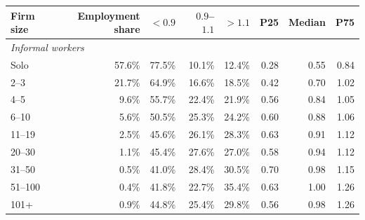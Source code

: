 \begin{tabular}{lrrrrrrr}
\toprule
    Firm size & Employment share & $<0.9$ & $0.9$--$1.1$ & $>1.1$ & P25 & Median & P75 \\
    \midrule
\multicolumn{8}{l}{\textit{Informal workers}} \\
Solo & 57.6\% & 77.5\% & 10.1\% & 12.4\% & 0.28 & 0.55 & 0.84 \\
2--3 & 21.7\% & 64.9\% & 16.6\% & 18.5\% & 0.42 & 0.70 & 1.02 \\
4--5 & 9.6\% & 55.7\% & 22.4\% & 21.9\% & 0.56 & 0.84 & 1.05 \\
6--10 & 5.6\% & 50.5\% & 25.3\% & 24.2\% & 0.60 & 0.88 & 1.06 \\
11--19 & 2.5\% & 45.6\% & 26.1\% & 28.3\% & 0.63 & 0.91 & 1.12 \\
20--30 & 1.1\% & 45.4\% & 27.6\% & 27.0\% & 0.58 & 0.94 & 1.12 \\
31--50 & 0.5\% & 41.0\% & 28.4\% & 30.5\% & 0.70 & 0.98 & 1.15 \\
51--100 & 0.4\% & 41.8\% & 22.7\% & 35.4\% & 0.63 & 1.00 & 1.26 \\
101+ & 0.9\% & 44.8\% & 25.4\% & 29.8\% & 0.56 & 0.98 & 1.26\\
\bottomrule\end{tabular}
